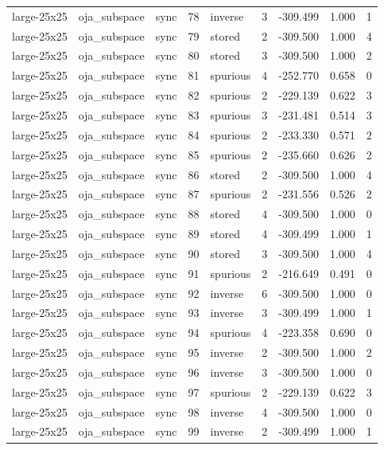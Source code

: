 \begin{tabular}{lllrlrrrr}
large-25x25 & oja\_subspace & sync & 78 & inverse & 3 & -309.499 & 1.000 & 1 \\
large-25x25 & oja\_subspace & sync & 79 & stored & 2 & -309.500 & 1.000 & 4 \\
large-25x25 & oja\_subspace & sync & 80 & stored & 3 & -309.500 & 1.000 & 2 \\
large-25x25 & oja\_subspace & sync & 81 & spurious & 4 & -252.770 & 0.658 & 0 \\
large-25x25 & oja\_subspace & sync & 82 & spurious & 2 & -229.139 & 0.622 & 3 \\
large-25x25 & oja\_subspace & sync & 83 & spurious & 3 & -231.481 & 0.514 & 3 \\
large-25x25 & oja\_subspace & sync & 84 & spurious & 2 & -233.330 & 0.571 & 2 \\
large-25x25 & oja\_subspace & sync & 85 & spurious & 2 & -235.660 & 0.626 & 2 \\
large-25x25 & oja\_subspace & sync & 86 & stored & 2 & -309.500 & 1.000 & 4 \\
large-25x25 & oja\_subspace & sync & 87 & spurious & 2 & -231.556 & 0.526 & 2 \\
large-25x25 & oja\_subspace & sync & 88 & stored & 4 & -309.500 & 1.000 & 0 \\
large-25x25 & oja\_subspace & sync & 89 & stored & 4 & -309.499 & 1.000 & 1 \\
large-25x25 & oja\_subspace & sync & 90 & stored & 3 & -309.500 & 1.000 & 4 \\
large-25x25 & oja\_subspace & sync & 91 & spurious & 2 & -216.649 & 0.491 & 0 \\
large-25x25 & oja\_subspace & sync & 92 & inverse & 6 & -309.500 & 1.000 & 0 \\
large-25x25 & oja\_subspace & sync & 93 & inverse & 3 & -309.499 & 1.000 & 1 \\
large-25x25 & oja\_subspace & sync & 94 & spurious & 4 & -223.358 & 0.690 & 0 \\
large-25x25 & oja\_subspace & sync & 95 & inverse & 2 & -309.500 & 1.000 & 2 \\
large-25x25 & oja\_subspace & sync & 96 & inverse & 3 & -309.500 & 1.000 & 0 \\
large-25x25 & oja\_subspace & sync & 97 & spurious & 2 & -229.139 & 0.622 & 3 \\
large-25x25 & oja\_subspace & sync & 98 & inverse & 4 & -309.500 & 1.000 & 0 \\
large-25x25 & oja\_subspace & sync & 99 & inverse & 2 & -309.499 & 1.000 & 1 \\

\end{tabular}
